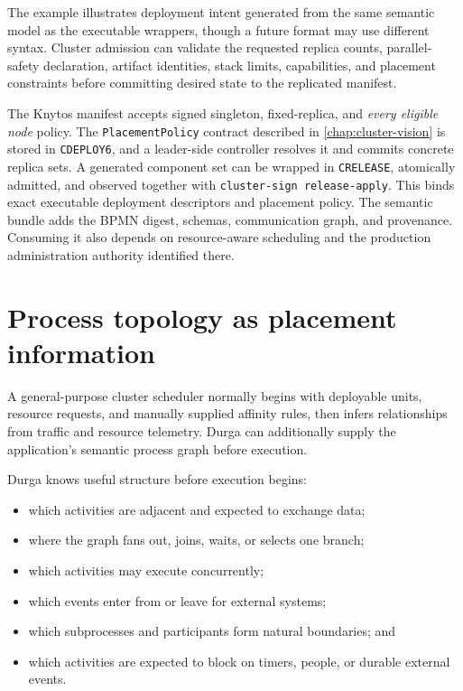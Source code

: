 The example illustrates deployment intent generated from the same semantic
model as the executable wrappers, though a future format may use different syntax.
Cluster admission can validate the requested replica counts,
parallel-safety declaration, artifact identities, stack limits, capabilities,
and placement constraints before committing desired state to the replicated
manifest.

The Knytos manifest accepts signed singleton, fixed-replica, and
\emph{every eligible node} policy. The \texttt{PlacementPolicy} contract
described in \autoref{chap:cluster-vision} is stored in \texttt{CDEPLOY6}, and a
leader-side controller resolves it and commits concrete replica sets. A
generated component set can be wrapped in \texttt{CRELEASE}, atomically
admitted, and observed together with \texttt{cluster-sign release-apply}.
This binds exact executable deployment descriptors and placement policy. The
semantic bundle adds the BPMN digest, schemas, communication graph, and
provenance. Consuming it also depends on resource-aware scheduling and the
production administration authority identified there.

\section{Process topology as placement information}

A general-purpose cluster scheduler normally begins with deployable units,
resource requests, and manually supplied affinity rules, then infers
relationships from traffic and resource telemetry. Durga can additionally
supply the application's semantic process graph before execution.

Durga knows useful structure before execution begins:

\begin{itemize}
    \item which activities are adjacent and expected to exchange data;
    \item where the graph fans out, joins, waits, or selects one branch;
    \item which activities may execute concurrently;
    \item which events enter from or leave for external systems;
    \item which subprocesses and participants form natural boundaries; and
    \item which activities are expected to block on timers, people, or durable
        external events.
\end{itemize}

